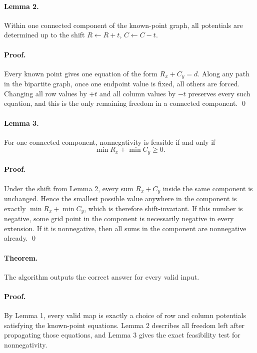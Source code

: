 \documentclass[11pt]{article}
\begin{document}
\paragraph{Lemma 2.}
Within one connected component of the known-point graph, all potentials are determined up to the shift
$R \leftarrow R+t$, $C \leftarrow C-t$.

\paragraph{Proof.}
Every known point gives one equation of the form $R_x + C_y = d$.
Along any path in the bipartite graph, once one endpoint value is fixed, all others are forced.
Changing all row values by $+t$ and all column values by $-t$ preserves every such equation, and this is
the only remaining freedom in a connected component. \qed

\paragraph{Lemma 3.}
For one connected component, nonnegativity is feasible if and only if
\[
\min R_x + \min C_y \ge 0.
\]

\paragraph{Proof.}
Under the shift from Lemma 2, every sum $R_x+C_y$ inside the same component is unchanged.
Hence the smallest possible value anywhere in the component is exactly
$\min R_x + \min C_y$, which is therefore shift-invariant.
If this number is negative, some grid point in the component is necessarily negative in every extension.
If it is nonnegative, then all sums in the component are nonnegative already. \qed

\paragraph{Theorem.}
The algorithm outputs the correct answer for every valid input.

\paragraph{Proof.}
By Lemma 1, every valid map is exactly a choice of row and column potentials satisfying the known-point
equations. Lemma 2 describes all freedom left after propagating those equations, and Lemma 3 gives the
exact feasibility test for nonnegativity.
\end{document}
